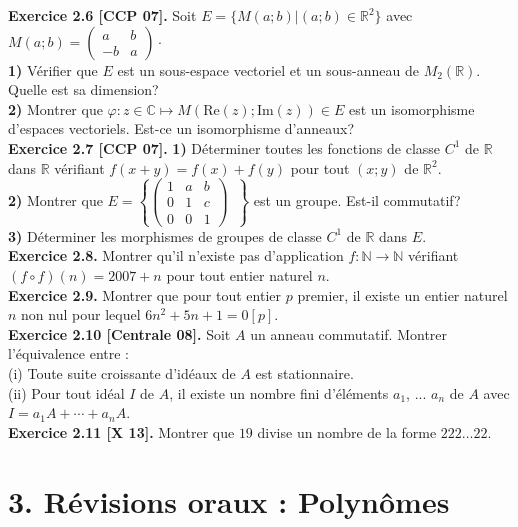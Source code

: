 \documentclass[a4paper,12pt,francais]{article}
\newcommand{\field}[1]{\mathbb{#1}}
\newcommand{\N}{\field{N}}
\newcommand{\R}{\field{R}}
\newcommand{\C}{\field{C}}
\newcommand{\im}{\mbox{Im}}
\begin{document}
\noindent
{\bf Exercice 2.6 [CCP 07].} Soit $E=\{ M(a;b) | (a;b) \in \R^2 \}$ avec 
$\displaystyle M(a;b)=\left( \begin{array}{cc}
a&b\\
-b&a
\end{array} \right)\cdot$\\
{\bf 1)} Vérifier que $E$ est un sous-espace vectoriel et un sous-anneau de $M_2(\R)$. Quelle est sa dimension?\\
{\bf 2)} Montrer que $\varphi : z \in \C \mapsto M(\mbox{Re}(z);\im (z)) \in E$ est un isomorphisme d'espaces vectoriels. Est-ce un isomorphisme d'anneaux?\\

\noindent
{\bf Exercice 2.7 [CCP 07].} {\bf 1)} Déterminer toutes les fonctions de classe $C^1$ de $\R$ dans $\R$ vérifiant $f(x+y)=f(x)+f(y)$ pour tout $(x;y)$ de $\R^2$.\\
{\bf 2)} Montrer que $\displaystyle E=\left\{ \left( \begin{array}{ccc}
1&a&b\\
0&1&c\\
0&0&1 \end{array} \right)\; \; \right\}$ est un groupe. Est-il commutatif?\\
{\bf 3)} Déterminer les morphismes de groupes de classe $C^1$ de $\R$ dans $E$.\\

\noindent
{\bf Exercice 2.8.} Montrer qu'il n'existe pas d'application $f:\N \to \N$ vérifiant $(f\circ f)(n)=2007+n$ pour tout entier naturel $n$.\\

\noindent
{\bf Exercice 2.9.} Montrer que pour tout entier $p$ premier, il existe un entier naturel $n$ non nul pour lequel $6n^2+5n+1=0 [p]$.\\

\noindent
{\bf Exercice 2.10 [Centrale 08].} Soit $A$ un anneau commutatif. Montrer l'équivalence entre :\\
(i) Toute suite croissante d'idéaux de $A$ est stationnaire.\\
(ii) Pour tout idéal $I$ de $A$, il existe un nombre fini d'éléments $a_1$, ... $a_n$ de $A$ avec $I=a_1A+\cdots +a_nA$.\\

\noindent
\noindent
{\bf Exercice 2.11 [X 13].} Montrer que $19$ divise un nombre de la forme $222\dots 22$.\\

\newpage
\section*{3. Révisions oraux : Polynômes} %
\end{document}
